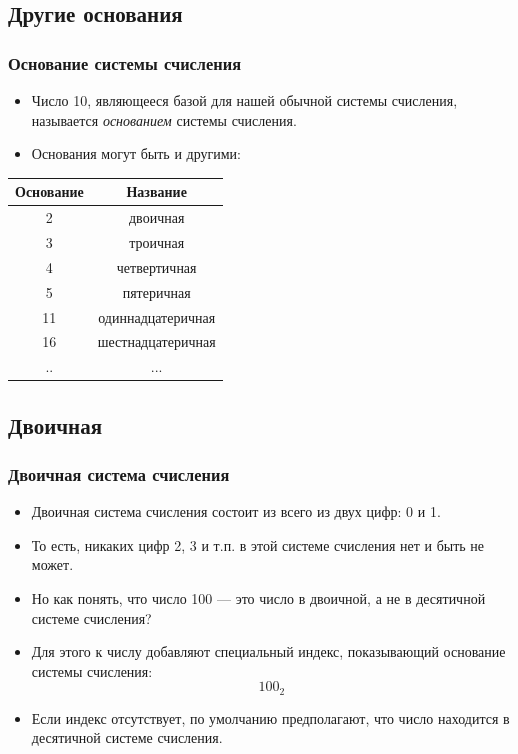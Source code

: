 \documentclass[compress,red]{beamer}
\begin{document}
\subsection{Другие основания}
\begin{frame}[fragile]
  \frametitle{Основание системы счисления}
  \begin{itemize}
    \item Число 10, являющееся базой для нашей обычной системы счисления, называется \emph{основанием} системы счисления.
    \item Основания могут быть и другими:
  \end{itemize}
  \begin{center}
  \begin{tabular}{cc}
    \hline
    \hline
      Основание & Название \\ 
    \hline
    \hline
      2 & двоичная \\
      3 & троичная \\
      4 & четвертичная \\
      5 & пятеричная \\
      11 & одиннадцатеричная \\
      16 & шестнадцатеричная \\
      .. & ... \\
  \end{tabular}
  \end{center}
\end{frame}

\subsection{Двоичная}
\begin{frame}[fragile]
  \frametitle{Двоичная система счисления}
  \begin{itemize}
    \item Двоичная система счисления состоит из всего из двух цифр: 0 и 1.
    \item То есть, никаких цифр 2, 3 и т.п. в этой системе счисления нет и быть не может.
    \item Но как понять, что число 100 --- это число в двоичной, а не в десятичной системе счисления?
    \item Для этого к числу добавляют специальный индекс, показывающий основание системы счисления:
    $$
      100_2
    $$
    \item Если индекс отсутствует, по умолчанию предполагают, что число находится в десятичной системе счисления.
  \end{itemize}
\end{frame}
\end{document}
